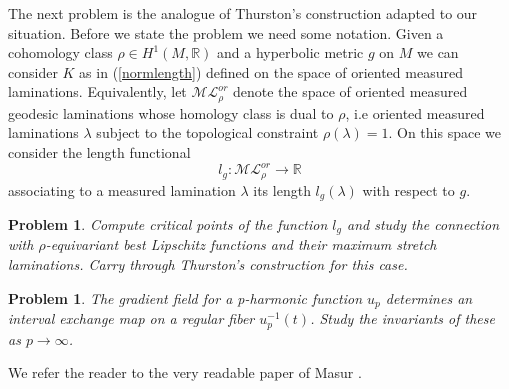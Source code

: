 \documentclass{ip-journal}
\newtheorem{problem}[theorem]{Problem}
\newtheorem{conjecture}[theorem]{Conjecture}
\theoremstyle{definition}
\numberwithin{equation}{section}
\newcommand{\R}{\mathbb R}
\begin{document}
The next problem is the analogue of Thurston's construction \cite{thurston} adapted to our situation. Before we state the problem we need some notation. Given a cohomology class $\rho \in H^1(M,\R)$ and  a hyperbolic metric $g$ on $M$ we can consider $K$ as in (\ref{normlength}) defined on the space of oriented measured laminations. Equivalently, let $\mathcal M \mathcal L_\rho^{or}$ denote the space of oriented measured geodesic laminations whose homology class is dual to $\rho$, i.e oriented measured laminations $\lambda$ subject to the topological constraint $\rho(\lambda)=1$. On this space we consider the length functional
\[
l_g: \mathcal M \mathcal L_\rho^{or} \rightarrow \R
\] 
associating to a measured lamination $\lambda$ its length $l_g(\lambda)$ with respect to $g$.
\begin{problem}\label{toyprobm} Compute critical points of the  function $l_g$ and study the connection with $\rho$-equivariant best Lipschitz functions and their maximum stretch laminations. Carry through Thurston's construction for this case. 
\end{problem}


\begin{problem}\label{Problem 8} The gradient field for a p-harmonic function $u_p$ determines an interval exchange map on a regular fiber $u_p^{-1}(t)$. Study the invariants of these as $p \rightarrow \infty$.
 \end{problem}
 We refer the reader to the very readable paper of Masur \cite{masur}.
\end{document}
